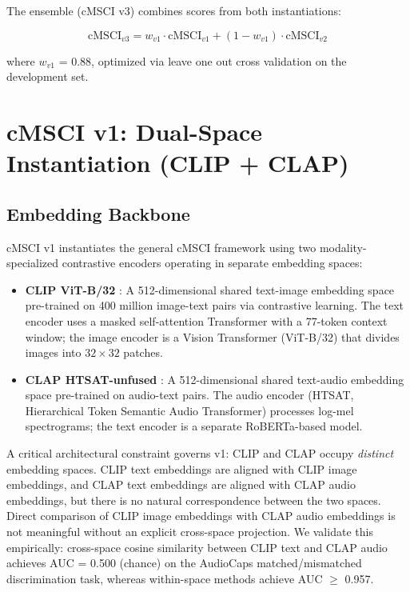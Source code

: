 \documentclass[a4paper,fleqn]{cas-sc}
\begin{document}
\begin{itemize}
The ensemble (cMSCI v3) combines scores from both instantiations:

\begin{equation}\label{eq:ensemble}
\mathrm{cMSCI}_{v3} = w_{v1} \cdot \mathrm{cMSCI}_{v1} + (1 - w_{v1}) \cdot \mathrm{cMSCI}_{v2}
\end{equation}

where $w_{v1}$ = 0.88, optimized via leave one out cross validation on the development set.


\section{cMSCI v1: Dual-Space Instantiation (CLIP + CLAP)}\label{sec:v1}

\subsection{Embedding Backbone}\label{sec:v1-backbone}

cMSCI v1 instantiates the general cMSCI framework using two modality-specialized contrastive encoders operating in separate embedding spaces:

\begin{itemize}
\item \textbf{CLIP ViT-B/32} \citep{radford2021learning}: A 512-dimensional shared text-image embedding space pre-trained on 400 million image-text pairs via contrastive learning. The text encoder uses a masked self-attention Transformer with a 77-token context window; the image encoder is a Vision Transformer (ViT-B/32) that divides images into $32 \times 32$ patches.

\item \textbf{CLAP HTSAT-unfused} \citep{wu2023large}: A 512-dimensional shared text-audio embedding space pre-trained on audio-text pairs. The audio encoder (HTSAT, Hierarchical Token Semantic Audio Transformer) processes log-mel spectrograms; the text encoder is a separate RoBERTa-based model.
\end{itemize}

A critical architectural constraint governs v1: CLIP and CLAP occupy \emph{distinct} embedding spaces. CLIP text embeddings are aligned with CLIP image embeddings, and CLAP text embeddings are aligned with CLAP audio embeddings, but there is no natural correspondence between the two spaces. Direct comparison of CLIP image embeddings with CLAP audio embeddings is not meaningful without an explicit cross-space projection. We validate this empirically: cross-space cosine similarity between CLIP text and CLAP audio achieves AUC = 0.500 (chance) on the AudioCaps matched/mismatched discrimination task, whereas within-space methods achieve AUC $\geq$ 0.957.


\end{itemize}
\end{document}
